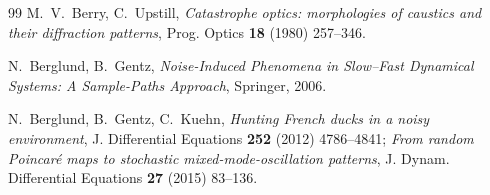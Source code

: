 \documentclass[11pt,reqno]{amsart}
\theoremstyle{plain}
\theoremstyle{definition}
\theoremstyle{remark}
\begin{document}
\begin{thebibliography}{99}
 M.~V.~Berry, C.~Upstill, \emph{Catastrophe optics: morphologies of caustics
and their diffraction patterns}, Prog. Optics \textbf{18} (1980) 257--346.

 N.~Berglund, B.~Gentz, \emph{Noise-Induced Phenomena in Slow--Fast Dynamical Systems:
A Sample-Paths Approach}, Springer, 2006.

 N.~Berglund, B.~Gentz, C.~Kuehn, \emph{Hunting French ducks in a noisy environment},
J. Differential Equations \textbf{252} (2012) 4786--4841; \emph{From random Poincar\'e maps to
stochastic mixed-mode-oscillation patterns}, J. Dynam. Differential Equations \textbf{27} (2015)
83--136.

\end{thebibliography}
\end{document}
